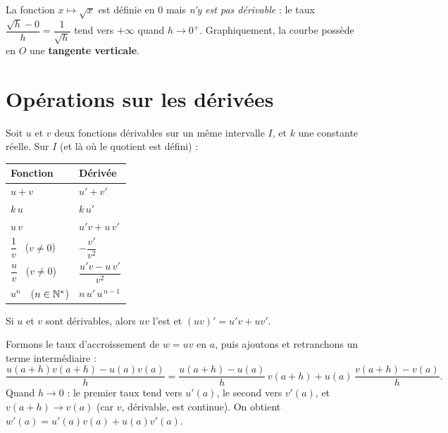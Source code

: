 \begin{remarque}
La fonction $x\mapsto\sqrt{x}$ est définie en $0$ mais \emph{n'y est pas dérivable} :
le taux $\dfrac{\sqrt{h}-0}{h}=\dfrac{1}{\sqrt{h}}$ tend vers $+\infty$ quand $h\to 0^+$.
Graphiquement, la courbe possède en $O$ une \textbf{tangente verticale}.
\end{remarque}

\section{Opérations sur les dérivées}

\begin{propriete}
Soit $u$ et $v$ deux fonctions dérivables sur un même intervalle $I$, et $k$ une
constante réelle. Sur $I$ (et là où le quotient est défini) :
\begin{center}\renewcommand{\arraystretch}{1.6}
\begin{tabular}{@{}l l@{}}
\toprule
\textbf{Fonction} & \textbf{Dérivée} \\
\midrule
$u+v$            & $u'+v'$ \\
$k\,u$           & $k\,u'$ \\
$u\,v$           & $u'v+u\,v'$ \\
$\dfrac{1}{v}$ \ ($v\neq 0$)   & $-\dfrac{v'}{v^2}$ \\
$\dfrac{u}{v}$ \ ($v\neq 0$)   & $\dfrac{u'v-u\,v'}{v^2}$ \\
$u^n$\ \ ($n\in\mathbb{N}^*$)          & $n\,u'\,u^{\,n-1}$ \\
\bottomrule
\end{tabular}
\end{center}
\end{propriete}

\begin{theoreme}
Si $u$ et $v$ sont dérivables, alors $uv$ l'est et $(uv)'=u'v+uv'$.
\end{theoreme}

\begin{exemple}
Formons le taux d'accroissement de $w=uv$ en $a$, puis ajoutons et retranchons un
terme intermédiaire :
\[ \frac{u(a+h)v(a+h)-u(a)v(a)}{h}
 =\frac{u(a+h)-u(a)}{h}\,v(a+h)+u(a)\,\frac{v(a+h)-v(a)}{h}. \]
Quand $h\to 0$ : le premier taux tend vers $u'(a)$, le second vers $v'(a)$, et
$v(a+h)\to v(a)$ (car $v$, dérivable, est continue). On obtient
$w'(a)=u'(a)v(a)+u(a)v'(a)$.
\end{exemple}

